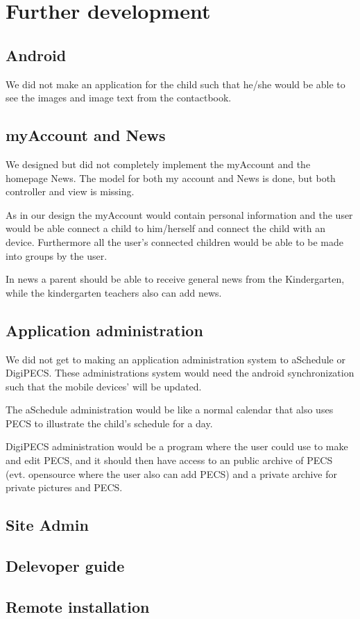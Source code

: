 \section{Further development}

\subsection{Android}
We did not make an application for the child such that he/she would be able to see the images and image text from the contactbook. 

\subsection{myAccount and News}
\label{myAccount}
We designed but did not completely implement the myAccount and the homepage News. The model for both my account and News is done, but both controller and view is missing.

As in our design the myAccount would contain personal information and the user would be able connect a child to him/herself and connect the child with an device. Furthermore all the user's connected children would be able to be made into groups by the user.

In news a parent should be able to receive general news from the Kindergarten, while the kindergarten teachers also can add news.  

\subsection{Application administration}
We did not get to making an application administration system to aSchedule or DigiPECS. These administrations system would need the android synchronization such that the mobile devices' will be updated. 

The aSchedule administration would be like a normal calendar that also uses PECS to illustrate the child's schedule for a day. 

DigiPECS administration would be a program where the user could use to make and edit PECS, and it should then have access to an public archive of PECS (evt. opensource where the user also can add PECS) and a private archive for private pictures and PECS. 

\subsection{Site Admin}

\subsection{Delevoper guide}

\subsection{Remote installation}